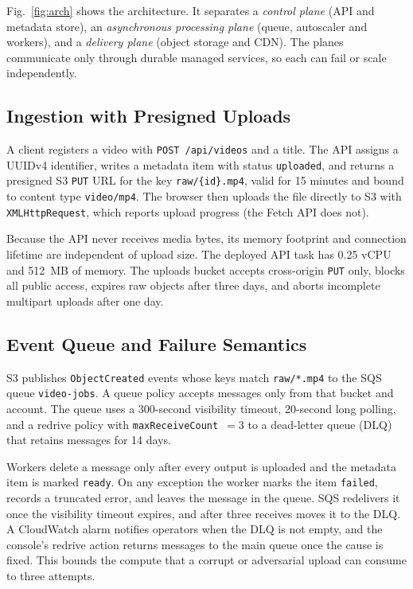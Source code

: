 \documentclass[conference]{IEEEtran}
\begin{document}
Fig.~\ref{fig:arch} shows the architecture. It separates a \emph{control plane} (API and metadata store), an \emph{asynchronous processing plane} (queue, autoscaler and workers), and a \emph{delivery plane} (object storage and CDN). The planes communicate only through durable managed services, so each can fail or scale independently.

\subsection{Ingestion with Presigned Uploads}
A client registers a video with \texttt{POST /api/videos} and a title. The API assigns a UUIDv4 identifier, writes a metadata item with status \texttt{uploaded}, and returns a presigned S3 \texttt{PUT} URL for the key \texttt{raw/\{id\}.mp4}, valid for 15 minutes and bound to content type \texttt{video/mp4}. The browser then uploads the file directly to S3 with \texttt{XMLHttpRequest}, which reports upload progress (the Fetch API does not).

Because the API never receives media bytes, its memory footprint and connection lifetime are independent of upload size. The deployed API task has 0.25 vCPU and 512~MB of memory. The uploads bucket accepts cross-origin \texttt{PUT} only, blocks all public access, expires raw objects after three days, and aborts incomplete multipart uploads after one day.

\subsection{Event Queue and Failure Semantics}\label{sec:design-queue}
S3 publishes \texttt{ObjectCreated} events whose keys match \texttt{raw/*.mp4} to the SQS queue \texttt{video-jobs}. A queue policy accepts messages only from that bucket and account. The queue uses a 300-second visibility timeout, 20-second long polling, and a redrive policy with \texttt{maxReceiveCount}~$=3$ to a dead-letter queue (DLQ) that retains messages for 14 days.

Workers delete a message only after every output is uploaded and the metadata item is marked \texttt{ready}. On any exception the worker marks the item \texttt{failed}, records a truncated error, and leaves the message in the queue. SQS redelivers it once the visibility timeout expires, and after three receives moves it to the DLQ. A CloudWatch alarm notifies operators when the DLQ is not empty, and the console's redrive action returns messages to the main queue once the cause is fixed. This bounds the compute that a corrupt or adversarial upload can consume to three attempts.
\end{document}
